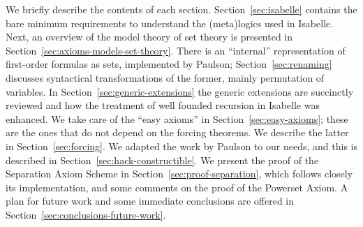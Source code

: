 We briefly describe the contents of each
section. Section~\ref{sec:isabelle} contains the bare minimum
requirements to understand the (meta)logics used in Isabelle. Next, an
overview of the model theory of set theory is presented in
Section~\ref{sec:axioms-models-set-theory}. There is an ``internal''
representation of first-order formulas as sets, implemented by
Paulson; Section~\ref{sec:renaming} discusses syntactical
transformations of the former, mainly permutation of variables. 
In Section~\ref{sec:generic-extensions} the generic extensions are
succinctly reviewed and how the treatment of well founded recursion in
Isabelle was enhanced. We take care of the ``easy axioms'' in
Section~\ref{sec:easy-axioms}; these are the ones that
do not depend on the forcing theorems. We describe the latter in
Section~\ref{sec:forcing}. We adapted the  work by Paulson to our
needs, and this is described in
Section~\ref{sec:hack-constructible}. We present the proof
of the Separation Axiom Scheme in Section~\ref{sec:proof-separation},
which follows closely its implementation, and some comments on the
proof of the Powerset Axiom. A plan for future work and
some immediate conclusions are offered in
Section~\ref{sec:conclusions-future-work}.

